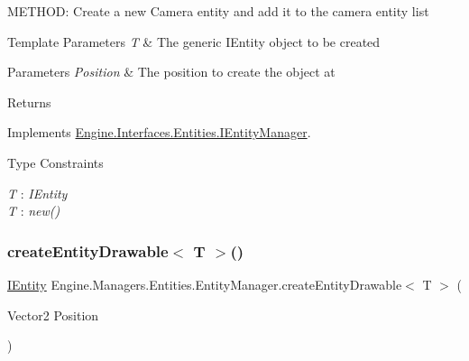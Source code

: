 M\+E\+T\+H\+OD\+: Create a new Camera entity and add it to the camera entity list 


\begin{DoxyTemplParams}{Template Parameters}
{\em T} & The generic I\+Entity object to be created\\
\hline
\end{DoxyTemplParams}

\begin{DoxyParams}{Parameters}
{\em Position} & The position to create the object at\\
\hline
\end{DoxyParams}
\begin{DoxyReturn}{Returns}

\end{DoxyReturn}


Implements \hyperlink{a00442_aad35a164d944dcb7af20470bac0d3351}{Engine.\+Interfaces.\+Entities.\+I\+Entity\+Manager}.

\begin{Desc}
\item[Type Constraints]\begin{description}
\item[{\em T} : {\em I\+Entity}]\item[{\em T} : {\em new()}]\end{description}
\end{Desc}
\mbox{\label{a00518_a787212a79eb20bd2c695783b5f802347}} 
\subsubsection{\texorpdfstring{create\+Entity\+Drawable$<$ T $>$()}{createEntityDrawable< T >()}}
{\footnotesize\ttfamily \hyperlink{a00438}{I\+Entity} Engine.\+Managers.\+Entities.\+Entity\+Manager.\+create\+Entity\+Drawable$<$ T $>$ (\begin{DoxyParamCaption}\item[{Vector2}]{Position }\end{DoxyParamCaption})\hspace{0.3cm}{\ttfamily [inline]}}



